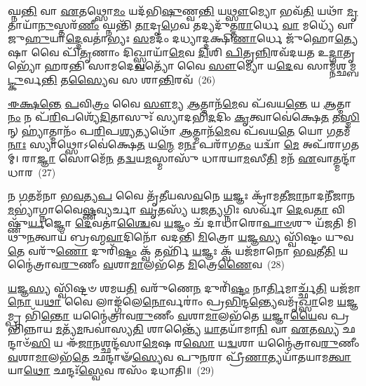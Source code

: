 {\anuvakamend[{\-\ul{𑌵}\-𑌪\-\ul{𑌯𑌾} 𑌷𑌟𑍍𑌤𑍍𑌰𑌿𑍞᳴𑌶𑌚𑍍𑌚}]}%

𑌘𑍍𑌨\-\ul{𑌨𑍍𑌤𑌿} 𑌵𑌾 \ul{𑌏}\-𑌤𑌥𑍍𑌸𑍋\-\ul{𑌮𑌂} 𑌯𑌦᳴𑌭𑌿\-\ul{𑌷𑍁}\-𑌣𑍍𑌵\-\ul{𑌨𑍍𑌤𑌿} 𑌯\-\ul{𑌥𑍍𑌸𑍗}\-𑌮𑍍𑌯𑍋 𑌭𑌵᳴\-\ul{𑌤𑌿} 𑌯𑌥𑌾᳴ \ul{𑌮𑍃}\-𑌤𑌾𑌯𑌾᳴\-\ul{𑌨𑍁}\-𑌸𑍍𑌤𑌰᳴\-\ul{𑌣𑍀𑌂} 𑌘𑍍𑌨𑌨𑍍𑌤𑌿᳴ \ul{𑌤𑌾}\-𑌦𑍃\-\ul{𑌗𑍇}\-𑌵 𑌤𑌦𑍍𑌯𑌦𑍁᳴𑌤𑍍𑌤\-\ul{𑌰𑌾}\-𑌰𑍍𑌧𑍇 \ul{𑌵𑌾} 𑌮𑌧𑍍𑌯𑍇᳴ 𑌵𑌾 𑌜𑍁\-\ul{𑌹𑍁}\-𑌯𑌾\-\ul{𑌦𑍍𑌦𑍇}\-𑌵𑌤𑌾॑𑌭𑍍𑌯𑌃 \ul{𑌸}\-𑌮𑌦𑌂᳴ 𑌦𑌧𑍍𑌯𑌾𑌦𑍍𑌦𑌕𑍍𑌷𑌿\-\ul{𑌣𑌾}\-𑌰𑍍𑌧𑍇 𑌜𑍁᳴𑌹𑍋\-\ul{𑌤𑍍𑌯𑍇}\-𑌷𑌾 𑌵𑍈 𑌪𑌿᳴\-\ul{𑌤𑍃}\-𑌣𑌾𑌂 𑌦𑌿𑌖𑍍𑌸𑍍𑌵𑌾𑌯𑌾᳴\-\ul{𑌮𑍇}\-𑌵 \ul{𑌦𑌿}\-𑌶𑌿 \ul{𑌪𑌿}\-𑌤𑍄\-\ul{𑌨𑍍𑌨𑌿}\-𑌰𑌵᳴𑌦𑌯𑌤 𑌉\-\ul{𑌦𑍍𑌗𑌾}\-𑌤𑍃𑌭𑍍𑌯𑍋᳴ 𑌹𑌰𑌨𑍍𑌤𑌿 𑌸𑌾𑌮𑌦𑍇\-\ul{𑌵}\-𑌤𑍍𑌯𑍋᳴ 𑌵𑍈 \ul{𑌸𑍗}\-𑌮𑍍𑌯𑍋 𑌯\-\ul{𑌦𑍇}\-𑌵 𑌸𑌾𑌮𑍍𑌨᳴𑌶𑍍𑌛𑌮𑍍𑌬\-\ul{𑌟𑍍𑌕𑍁}\-𑌰𑍍𑌵\-\ul{𑌨𑍍𑌤𑌿} 𑌤\-\ul{𑌸𑍍𑌯𑍈}\-𑌵 𑌸 𑌶𑌾\-\ul{𑌨𑍍𑌤𑌿}\-𑌰𑌵᳴~(26)

\-\ul{𑌈}\-\-\ul{𑌕𑍍𑌷}\-\-\ul{𑌨𑍍𑌤𑍇} \ul{𑌪}\-𑌵𑌿\-\ul{𑌤𑍍𑌰𑌂} 𑌵𑍈 \ul{𑌸𑍗}\-𑌮𑍍𑌯 \ul{𑌆}\-𑌤𑍍𑌮𑌾𑌨᳴\-\ul{𑌮𑍇}\-𑌵 𑌪᳴𑌵𑌯\-\ul{𑌨𑍍𑌤𑍇} 𑌯 \ul{𑌆}\-𑌤𑍍𑌮𑌾\-\ul{𑌨𑌂} 𑌨 𑌪᳴\-\ul{𑌰𑌿}\-𑌪𑌶𑍍𑌯𑍇᳴\-\ul{𑌦𑌿}\-𑌤𑌾𑌸𑍁𑌃᳴ 𑌸𑍍𑌯𑌾𑌦𑌭𑌿\-\ul{𑌦}\-𑌦𑌿𑌂 \ul{𑌕𑍃}\-𑌤𑍍𑌵𑌾𑌵𑍇॑𑌕𑍍𑌷𑍇\-\ul{𑌤} 𑌤\-\ul{𑌸𑍍𑌮𑌿}\-𑌨𑍍 𑌹𑍍𑌯𑌾॑𑌤𑍍𑌮𑌾𑌨𑌂᳴ 𑌪\-\ul{𑌰𑌿}\-𑌪\-\ul{𑌶𑍍𑌯}\-𑌤𑍍𑌯𑌥𑍋᳴ \ul{𑌆}\-𑌤𑍍𑌮𑌾𑌨᳴\-\ul{𑌮𑍇}\-𑌵 𑌪᳴𑌵𑌯\-\ul{𑌤𑍇} 𑌯𑍋 \ul{𑌗}\-𑌤𑌮᳴\-\ul{𑌨𑌾𑌃} 𑌸𑍍𑌯𑌾𑌥𑍍𑌸𑍋\-𑌽𑌵𑍇॑𑌕𑍍𑌷𑍇\-\ul{𑌤} 𑌯\-\ul{𑌨𑍍𑌮𑍇} 𑌮\-\ul{𑌨𑌃} 𑌪𑌰𑌾᳴𑌗\-\ul{𑌤𑌂} 𑌯𑌦𑍍𑌵𑌾᳴ \ul{𑌮𑍇} 𑌅𑌪᳴𑌰𑌾𑌗𑌤𑌮𑍍। 𑌰𑌾\-\ul{𑌜𑍍𑌞𑌾} 𑌸𑍋𑌮𑍇᳴\-\ul{𑌨} 𑌤\-\ul{𑌦𑍍𑌵}\-𑌯\-\ul{𑌮}\-𑌸𑍍𑌮𑌾𑌸𑍁᳴ 𑌧𑌾𑌰𑌯𑌾\-\ul{𑌮}\-𑌸𑍀\-\ul{𑌤𑌿} 𑌮𑌨᳴ \ul{𑌏}\-𑌵𑌾𑌤𑍍𑌮𑌨𑍍𑌦𑌾᳴𑌧𑌾𑌰~(27)

𑌨 \ul{𑌗}\-𑌤𑌮᳴𑌨𑌾 𑌭\-\ul{𑌵}\-𑌤𑍍𑌯\-\ul{𑌪} 𑌵𑍈 𑌤𑍃᳴𑌤𑍀𑌯𑌸\-\ul{𑌵}\-𑌨𑍇 \ul{𑌯}\-𑌜𑍍𑌞𑌃 𑌕𑍍𑌰𑌾᳴𑌮𑌤𑍀\-\ul{𑌜𑌾}\-𑌨𑌾𑌦𑌨𑍀᳴𑌜𑌾𑌨\-\ul{𑌮}\-𑌭𑍍𑌯𑌾॑𑌗𑍍𑌨𑌾𑌵𑍈\-\ul{𑌷𑍍𑌣}\-𑌵𑍍𑌯𑌰𑍍𑌚𑌾 \ul{𑌘𑍃}\-𑌤𑌸𑍍𑌯᳴ 𑌯𑌜\-\ul{𑌤𑍍𑌯}\-𑌗𑍍𑌨𑌿𑌃 𑌸𑌰𑍍𑌵𑌾᳴ \ul{𑌦𑍇}\-𑌵\-\ul{𑌤𑌾} 𑌵𑌿𑌷𑍍𑌣𑍁᳴\-\ul{𑌰𑍍𑌯}\-𑌜𑍍𑌞𑍋 \ul{𑌦𑍇}\-𑌵𑌤𑌾॑\-\ul{𑌶𑍍𑌚𑍈}\-𑌵 \ul{𑌯}\-𑌜𑍍𑌞𑌂 𑌚᳴ 𑌦𑌾𑌧𑌾𑌰𑍋\-\ul{𑌪𑌾}\-\-\ul{𑍞}\-𑌶𑍁 𑌯᳴𑌜𑌤𑌿 𑌮𑌿𑌥𑍁\-\ul{𑌨}\-𑌤𑍍𑌵𑌾𑌯᳴ 𑌬𑍍𑌰𑌹𑍍𑌮\-\ul{𑌵𑌾}\-𑌦𑌿𑌨𑍋᳴ 𑌵𑌦𑌨𑍍𑌤𑌿 \ul{𑌮𑌿}\-𑌤𑍍𑌰𑍋 \ul{𑌯}\-𑌜𑍍𑌞\-\ul{𑌸𑍍𑌯} 𑌸𑍍𑌵𑌿᳴𑌷𑍍𑌟𑌂 𑌯𑍁𑌵\-\ul{𑌤𑍇} 𑌵𑌰𑍁᳴\-\ul{𑌣𑍋} 𑌦𑍁𑌰𑌿᳴\-\ul{𑌷𑍍𑌟𑌂} 𑌕𑍍𑌵᳴ 𑌤𑌰𑍍\mbox{}𑌹𑌿᳴ \ul{𑌯}\-𑌜𑍍𑌞𑌃 𑌕𑍍𑌵᳴ 𑌯𑌜᳴𑌮𑌾𑌨𑍋 𑌭\-\ul{𑌵}\-𑌤𑍀\-\ul{𑌤𑌿} 𑌯𑌨𑍍𑌮𑍈॑𑌤𑍍𑌰𑌾𑌵\-\ul{𑌰𑍁}\-𑌣𑍀𑌂 \ul{𑌵}\-𑌶𑌾\-\ul{𑌮𑌾}\-𑌲𑌭᳴𑌤𑍇 \ul{𑌮𑌿}\-𑌤𑍍𑌰𑍇\-\ul{𑌣𑍈}\-𑌵~(28)

\-\ul{𑌯}\-𑌜𑍍𑌞\-\ul{𑌸𑍍𑌯} 𑌸𑍍𑌵𑌿᳴𑌷𑍍𑌟𑍞 𑌶𑌮𑌯\-\ul{𑌤𑌿} 𑌵𑌰𑍁᳴𑌣𑍇\-\ul{𑌨} 𑌦𑍁𑌰𑌿᳴\-\ul{𑌷𑍍𑌟𑌂} 𑌨𑌾\-\ul{𑌰𑍍𑌤𑌿}\-𑌮𑌾𑌰𑍍𑌚𑍍𑌛᳴\-\ul{𑌤𑌿} 𑌯𑌜᳴𑌮𑌾\-\ul{𑌨𑍋} 𑌯\-\ul{𑌥𑌾} 𑌵𑍈 𑌲𑌾𑌙𑍍𑌗᳴𑌲𑍇\-\ul{𑌨𑍋}\-𑌰𑍍𑌵𑌰𑌾𑌂॑ 𑌪𑍍𑌰\-\ul{𑌭𑌿}\-𑌨𑍍𑌦\-\ul{𑌨𑍍𑌤𑍍𑌯𑍇}\-𑌵𑌮𑍃᳴\-\ul{𑌖𑍍𑌸𑌾}\-𑌮𑍇 \ul{𑌯}\-𑌜𑍍𑌞𑌮𑍍𑌪𑍍𑌰 𑌭𑌿᳴\-\ul{𑌨𑍍𑌤𑍋} 𑌯𑌨𑍍𑌮𑍈॑𑌤𑍍𑌰𑌾𑌵\-\ul{𑌰𑍁}\-𑌣𑍀𑌂 \ul{𑌵}\-𑌶𑌾\-\ul{𑌮𑌾}\-𑌲𑌭᳴𑌤𑍇 \ul{𑌯}\-𑌜𑍍𑌞𑌾\-\ul{𑌯𑍈}\-𑌵 𑌪𑍍𑌰𑌭𑌿᳴𑌨𑍍𑌨𑌾𑌯 \ul{𑌮}\-𑌤𑍍𑌯᳴\-\ul{𑌮}\-𑌨𑍍𑌵𑌵𑌾॑𑌸𑍍𑌯\-\ul{𑌤𑌿} 𑌶𑌾𑌨𑍍𑌤𑍍𑌯𑍈᳴ \ul{𑌯𑌾}\-𑌤𑌯𑌾᳴𑌮𑌾\-\ul{𑌨𑌿} 𑌵𑌾 \ul{𑌏}\-𑌤\-\ul{𑌸𑍍𑌯} 𑌛𑌨𑍍𑌦𑌾𑍞᳴\-\ul{𑌸𑌿} 𑌯 𑌈᳴\-\ul{𑌜𑌾}\-𑌨𑌶𑍍𑌛𑌨𑍍𑌦᳴𑌸𑌾\-\ul{𑌮𑍇}\-𑌷 𑌰\-\ul{𑌸𑍋} 𑌯\-\ul{𑌦𑍍𑌵}\-𑌶𑌾 𑌯𑌨𑍍𑌮𑍈॑𑌤𑍍𑌰𑌾𑌵\-\ul{𑌰𑍁}\-𑌣𑍀𑌂 \ul{𑌵}\-𑌶𑌾\-\ul{𑌮𑌾}\-𑌲𑌭᳴\-\ul{𑌤𑍇} 𑌛𑌨𑍍𑌦𑌾𑍟᳴\-\ul{𑌸𑍍𑌯𑍇}\-𑌵 𑌪𑍁\-\ul{𑌨}\-𑌰𑌾 𑌪𑍍𑌰𑍀᳴\-\ul{𑌣𑌾}\-𑌤𑍍𑌯𑌯𑌾᳴𑌤𑌯𑌾𑌮\-\ul{𑌤𑍍𑌵𑌾}\-𑌯𑌾\-\ul{𑌥𑍋} 𑌛𑌨𑍍𑌦𑌃᳴\-\ul{𑌸𑍍𑌵𑍇}\-𑌵 𑌰𑌸𑌂᳴ 𑌦𑌧𑌾𑌤𑌿॥~(29)

